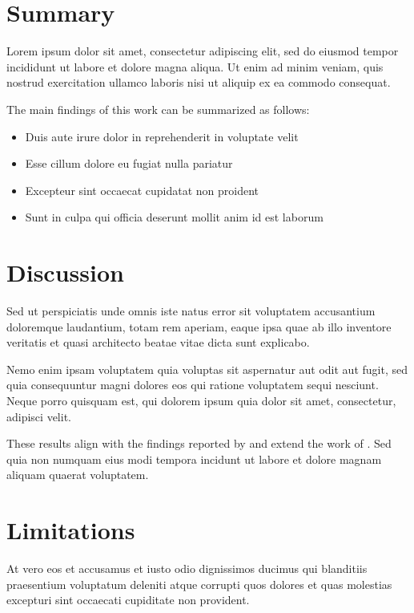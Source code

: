 \documentclass[../main.tex]{subfiles}
\begin{document}
\section{Summary}

Lorem ipsum dolor sit amet, consectetur adipiscing elit, sed do eiusmod tempor incididunt ut labore et dolore magna aliqua. Ut enim ad minim veniam, quis nostrud exercitation ullamco laboris nisi ut aliquip ex ea commodo consequat.

The main findings of this work can be summarized as follows:
\begin{itemize}
    \item Duis aute irure dolor in reprehenderit in voluptate velit
    \item Esse cillum dolore eu fugiat nulla pariatur
    \item Excepteur sint occaecat cupidatat non proident
    \item Sunt in culpa qui officia deserunt mollit anim id est laborum
\end{itemize}

\section{Discussion}

Sed ut perspiciatis unde omnis iste natus error sit voluptatem accusantium doloremque laudantium, totam rem aperiam, eaque ipsa quae ab illo inventore veritatis et quasi architecto beatae vitae dicta sunt explicabo.

Nemo enim ipsam voluptatem quia voluptas sit aspernatur aut odit aut fugit, sed quia consequuntur magni dolores eos qui ratione voluptatem sequi nesciunt. Neque porro quisquam est, qui dolorem ipsum quia dolor sit amet, consectetur, adipisci velit.

These results align with the findings reported by \textcite{smith2023} and extend the work of \textcite{jones2022}. Sed quia non numquam eius modi tempora incidunt ut labore et dolore magnam aliquam quaerat voluptatem.

\section{Limitations}

At vero eos et accusamus et iusto odio dignissimos ducimus qui blanditiis praesentium voluptatum deleniti atque corrupti quos dolores et quas molestias excepturi sint occaecati cupiditate non provident.
\end{document}
